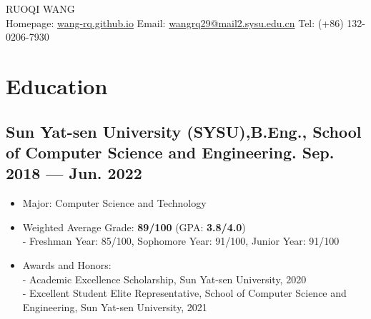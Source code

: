 \documentclass[a4,11pt]{article}
\newenvironment{zitemize}{
\begin{itemize}\itemsep0pt \parskip0pt \parsep1pt}
{\end{itemize}\vspace{-0.5cm}}
\begin{document}
\begin{center}

    \begin{minipage}[b]{0.9\textwidth}
            \centering
            {\Huge RUOQI WANG} \\ %
            \vspace{0.2cm}
			   Homepage: \href{https://wang-rq.github.io}{wang-rq.github.io} \space \space \space \space \space \space \space \space \space \space \space \space
Email: \href{mailto:wangrq29@mail2.sysu.edu.cn}{wangrq29@mail2.sysu.edu.cn} \space \space \space \space \space \space \space \space \space \space \space \space 
Tel: (+86) 132-0206-7930 
	\vspace{0.1cm}
    \end{minipage}%

    
\vspace{-0.15cm} 

\end{center}




\section{\large \textbf{Education}}

\subsection*{Sun Yat-sen University (SYSU),\space \space \space \space  B.Eng., \space \space \space \space    School of Computer Science and Engineering. \hfill Sep. 2018 --- Jun. 2022 } 
    \begin{zitemize}
        \item Major: Computer Science and Technology
		\item Weighted Average Grade: \textbf{89/100} (GPA: \textbf{3.8/4.0}) \\
		 - \space \space Freshman Year: 85/100, \space \space Sophomore Year: 91/100, \space \space Junior Year: 91/100
		\item Awards and Honors: \\
		 - \space \space Academic Excellence Scholarship, Sun Yat-sen University, 2020\\
		- \space \space Excellent Student Elite Representative, School of Computer Science and Engineering, Sun Yat-sen University, 2021\\
		

    \end{zitemize}
\vspace{0.2cm}
\end{document}
